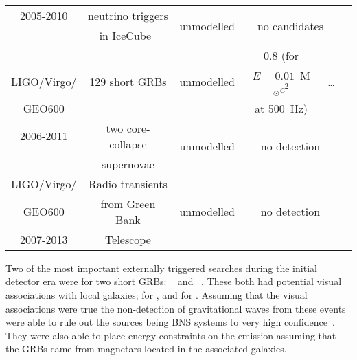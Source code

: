 \begin{longtable}{c|ccccc}
\cline{2-6}
2005-2010  & neutrino triggers                     & \multirow{2}{*}{unmodelled} & \multicolumn{2}{c}{\multirow{2}{*}{no candidates}} & \multirow{2}{*}{\cite{2014PhRvD..90j2002A}} \\
           & in IceCube~\cite{2006APh....26..155I} &                                                    & \\
\hline
            & \multirow{3}{*}{129 short GRBs} & \multirow{3}{*}{unmodelled} & 0.8 (for                   & \multirow{3}{*}{\ldots} & \multirow{3}{*}{\cite{2014PhRvD..89l2004A}} \\
LIGO/Virgo/ &                                 &                             & $E = 0.01$~M$_{\odot}c^2$  & & \\
GEO600      &                                 &                             &  at 500~Hz)                & & \\
\cline{2-6}
2006-2011   & two core-collapse & \multirow{2}{*}{unmodelled} & \multicolumn{2}{c}{\multirow{2}{*}{no detection}} & \multirow{2}{*}{\cite{Abbott:2016tdt}} \\
            & supernovae        &                             &                                                   & \\
\hline
LIGO/Virgo/ & Radio transients & \multirow{3}{*}{unmodelled} & \multicolumn{2}{c}{\multirow{3}{*}{no detection}} & \multirow{3}{*}{\cite{2016PhRvD..93l2008A}} \\
GEO600      & from Green Bank  &                             & & \\
2007-2013   & Telescope        &                             & & \\
\hline
\hline
\end{longtable}

Two of the most important externally triggered searches during the initial detector era were for two short GRBs: ~\cite{Golenetskii:2007a,Golenetskii:2007b} and 
~\cite{2005GCN..4197....1G}. These both had potential visual
associations with local galaxies;  for , and  for
. Assuming that the visual associations were true the non-detection of gravitational
waves from these events were able to rule out the sources being BNS systems to very high confidence~\cite{Abbott:2008g,2012ApJ...755....2A}.
They were also able to place energy constraints on the emission assuming that the GRBs came from magnetars located
in the associated galaxies.

